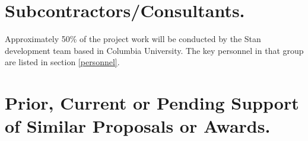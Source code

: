 \documentclass[11pt]{nih2016}
\begin{document}
\section{Subcontractors/Consultants.}




Approximately 50\% of the project work will be conducted by the Stan
development team based in Columbia University. The key personnel in
that group are listed in section \ref{personnel}.

\section{Prior, Current or Pending Support of Similar Proposals or Awards.}




\end{document}
